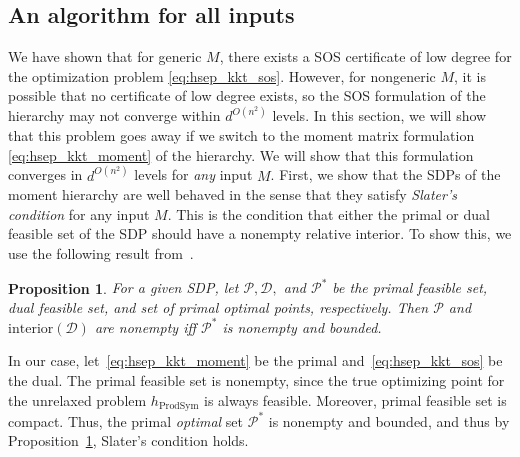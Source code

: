\documentclass[aps,pra,notitlepage,preprintnumbers,11pt,tightenlines]{revtex4-1}
\DeclareMathOperator{\ProdSym}{ProdSym}
\newtheorem{proposition}[theorem]{Proposition}
\begin{document}
\subsection{An algorithm for all inputs}
We have shown that for generic $M$, there exists a SOS certificate of
low degree for the optimization problem
\eqref{eq:hsep_kkt_sos}. However, for nongeneric $M$, it is possible
that no certificate of low degree exists, so the SOS formulation of
the hierarchy may not converge within $d^{O(n^2)}$ levels. In this section, we will
show that this problem goes away if we switch to the moment matrix
formulation \eqref{eq:hsep_kkt_moment} of the hierarchy. We will show that this formulation
converges in $d^{O(n^2)}$ levels for \emph{any} input $M$. First,
we show that the SDPs of the moment hierarchy are well behaved in the
sense that they satisfy \emph{Slater's condition} for any input
$M$. This is the condition that either the primal or dual feasible set
of the SDP should have a nonempty relative interior. To show this, we use
the following result from~\cite{trnovska:2005, josz:2014}.
\begin{proposition} 
  For a given SDP, let $\mathcal{P}, \mathcal{D},$ and $\mathcal{P}^*$ be the primal
  feasible set, dual feasible set, and set of primal optimal points,
  respectively. Then $\mathcal{P}$ and
  $\mathrm{interior}(\mathcal{D})$ are nonempty iff $\mathcal{P}^*$
  is nonempty and bounded.
\label{prop:slater}
\end{proposition}
In our case, let~\eqref{eq:hsep_kkt_moment} be the primal
and~\eqref{eq:hsep_kkt_sos} be the dual. The primal feasible set is
nonempty, since the true optimizing point for the unrelaxed problem
$h_{\ProdSym}$ is always feasible. Moreover, primal feasible set is
compact. Thus, the primal \emph{optimal} set $\mathcal{P}^*$ is nonempty
and bounded, and thus by Proposition~\ref{prop:slater}, Slater's
condition holds.
\end{document}
